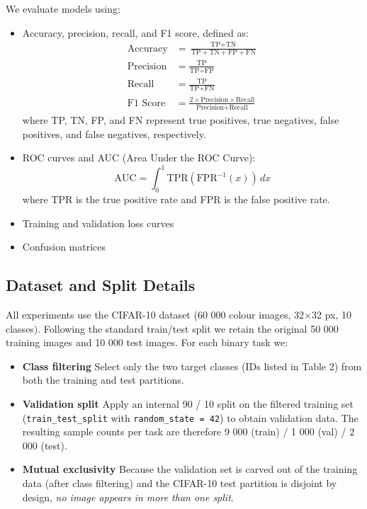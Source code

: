 \documentclass[11pt]{article}
\begin{document}
We evaluate models using:
\begin{itemize}
\item Accuracy, precision, recall, and F1 score, defined as:
\begin{align}
\text{Accuracy} &= \frac{\text{TP} + \text{TN}}{\text{TP} + \text{TN} + \text{FP} + \text{FN}} \\[0.5em]
\text{Precision} &= \frac{\text{TP}}{\text{TP} + \text{FP}} \\[0.5em]
\text{Recall} &= \frac{\text{TP}}{\text{TP} + \text{FN}} \\[0.5em]
\text{F1 Score} &= \frac{2 \times \text{Precision} \times \text{Recall}}{\text{Precision} + \text{Recall}}
\end{align}
where TP, TN, FP, and FN represent true positives, true negatives, false positives, and false negatives, respectively.

\item ROC curves and AUC (Area Under the ROC Curve):
\begin{equation}
\text{AUC} = \int_{0}^{1} \text{TPR}(\text{FPR}^{-1}(x)) \, dx
\end{equation}
where TPR is the true positive rate and FPR is the false positive rate.

\item Training and validation loss curves
\item Confusion matrices
\end{itemize}

\subsection{Dataset and Split Details}
All experiments use the CIFAR-10 dataset (60 000 colour images, 32×32 px, 10 classes). Following the standard train/test split we retain the original 50 000 training images and 10 000 test images. For each binary task we:
\begin{itemize}
\item \textbf{Class filtering} Select only the two target classes (IDs listed in Table 2) from both the training and test partitions.
\item \textbf{Validation split} Apply an internal 90 / 10 split on the filtered training set (\texttt{train\_test\_split} with \texttt{random\_state = 42}) to obtain validation data. The resulting sample counts per task are therefore 9 000 (train) / 1 000 (val) / 2 000 (test).
\item \textbf{Mutual exclusivity} Because the validation set is carved out of the training data (after class filtering) and the CIFAR-10 test partition is disjoint by design, \textit{no image appears in more than one split}.
\end{itemize}
\end{document}
